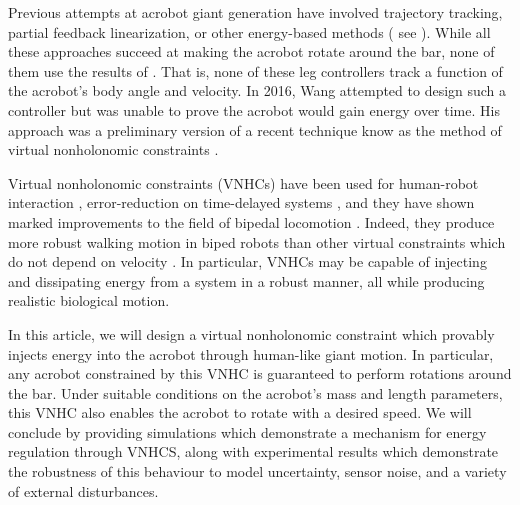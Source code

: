 \documentclass[journal,twoside,onecolumn,draftclsnofoot,web]{ieeecolor}
\begin{document}
Previous attempts at acrobot giant generation have involved
trajectory tracking, partial feedback linearization, or other energy-based
methods
( see
\cite{energy_pumping_robotic_swinging,swingup_giant_acrobot,dynamical_servo_acrobot_vc,control_giant_two_link_gymnastic_robot}
).
While all these approaches succeed at making the acrobot rotate around the
bar, none of them use the results of \cite{pendulum_length_giant_gymnastics}.
That is, none of these leg controllers track a function of the acrobot's body
angle and velocity.
In 2016, Wang attempted to design such a controller \cite{xingbo_thesis}
but was unable to prove the acrobot would gain energy over time.
His approach was a preliminary version of a recent technique know as the method
of virtual nonholonomic constraints \cite{hybrid_zero_dynamics_bipedal_nhvcs}.

Virtual nonholonomic constraints (VNHCs) have been used for human-robot interaction
\cite{vnhc_human_robot_cooperation,psd_based_vnhc_redundant_manipulator,haptic_vnhc},
error-reduction on time-delayed systems \cite{vnhc_time_delay_teleop},
and they have shown marked improvements to the field of bipedal locomotion 
\cite{nhvc_dynamic_walking,
hybrid_zero_dynamics_bipedal_nhvcs,output_nhvc_bipedal_control}.
Indeed, they produce more robust walking motion in biped robots than
other virtual constraints which do not depend on velocity
\cite{nhvc_incline_walking}.
In particular, VNHCs may be capable of injecting and
dissipating energy from a system in a robust manner, all while producing realistic
biological motion. 

In this article, we will design a virtual nonholonomic constraint which provably
injects energy into the acrobot through human-like giant motion.
In particular, any acrobot constrained by this VNHC is guaranteed to perform
rotations around the bar.
Under suitable conditions on the acrobot's mass and length parameters, this VNHC
also enables the acrobot to rotate with a desired speed.
We will conclude by providing simulations which demonstrate a mechanism for
energy regulation through VNHCS, along with experimental results which
demonstrate the robustness of this behaviour to model uncertainty, sensor noise,
and a variety of external disturbances. 
\end{document}
